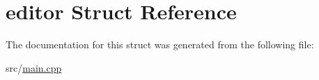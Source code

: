 \hypertarget{structeditor}{\section{editor Struct Reference}
\label{structeditor}
}


The documentation for this struct was generated from the following file\-:\begin{DoxyCompactItemize}
\item 
src/\hyperlink{main_8cpp}{main.\-cpp}\end{DoxyCompactItemize}
